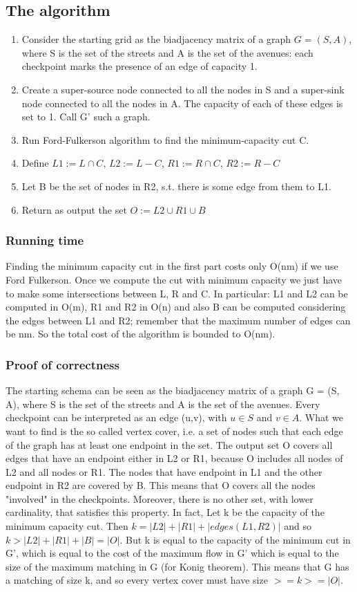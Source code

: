 \documentclass[12pt]{article}
\begin{document}
\subsection{The algorithm}
\begin{enumerate}
	\item Consider the starting grid as the biadjacency matrix of a graph $G = (S, A)$, where S is the set of the streets and A is the set of the avenues: each checkpoint marks the presence of an edge of capacity 1.
	\item Create a super-source node connected to all the nodes in S and a super-sink node connected to all the nodes in A. The capacity of each of these edges is set to 1. Call G' such a graph.
	\item Run Ford-Fulkerson algorithm to find the minimum-capacity cut C.
	\item Define $L1 := L \cap C$, $L2 := L - C$, $R1 := R \cap C$, $R2 := R - C$
	\item Let B be the set of nodes in R2, s.t. there is some edge from them to L1.
	\item Return as output the set $O:= L2 \cup R1 \cup B$
\end{enumerate}

\subsubsection{Running time}
Finding the minimum capacity cut in the first part costs only O(nm) if we use Ford Fulkerson. Once we compute the cut with minimum capacity we just have to make some intersections between L, R and C. In particular: L1 and L2 can be computed in O(m), R1 and R2 in O(n) and also B can be computed considering the edges between L1 and R2; remember that the maximum number of edges can be nm. So the total cost of the algorithm is bounded to O(nm).

\subsubsection{Proof of correctness}
The starting schema can be seen as the biadjacency matrix of a graph G = (S, A), where S is the set of the streets and A is the set of the avenues. Every checkpoint can be interpreted as an edge (u,v), with $u \in S$ and $v \in A$. What we want to find is the so called vertex cover, i.e. a set of nodes such that each edge of the graph has at least one endpoint in the set.
The output set O covers all edges that have an endpoint either in L2 or R1, because O includes all nodes of L2 and all nodes or R1. The nodes that have endpoint in L1 and the other endpoint in R2 are covered by B. This means that O covers all the nodes "involved" in the checkpoints. Moreover, there is no other set, with lower cardinality, that satisfies this property. In fact, Let k be the capacity of the minimum capacity cut. Then $k = |L2| + |R1| + |edges(L1,R2)|$ and so $k > |L2| + |R1| + |B| = |O|$. But k is equal to the capacity of the minimum cut in G', which is equal to the cost of the maximum flow in G' which is equal to the size of the maximum matching in G (for Konig theorem). This means that G has a matching of size k, and so every vertex cover must have size $>= k >= |O|$.
\end{document}
